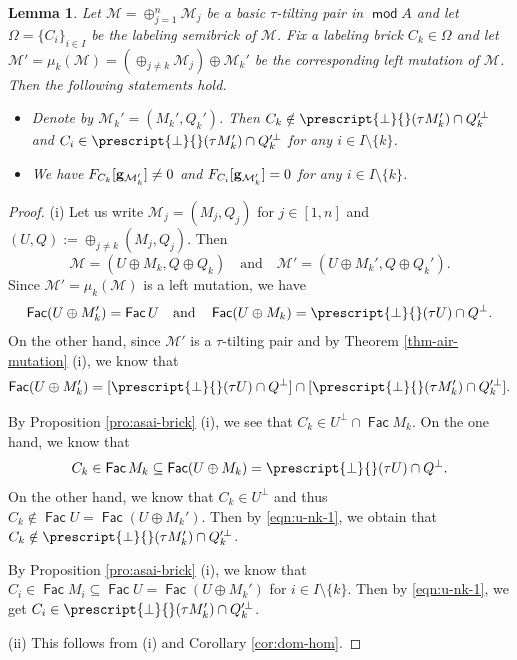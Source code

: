 \documentclass[10pt]{amsart}
\newtheorem{lemma}[theorem]{Lemma}
\theoremstyle{definition}
\theoremstyle{remark}
\numberwithin{equation}{section}
\def\mod{\opname{mod}\nolimits}
\newcommand{\opname}[1]{\operatorname{\mathsf{#1}}}
\newcommand{\Fac}{\opname{Fac}}
\begin{document}
\begin{lemma}\label{lem:multi-brick}
Let $\mathcal M=\oplus_{j=1}^n \mathcal M_j$ be a basic $\tau$-tilting pair in $\mod A$ and let $\Omega=\{C_i\}_{i\in I}$ be the labeling semibrick of $\mathcal M$. Fix a labeling brick $C_k\in\Omega$ and let  $\mathcal M'=\mu_k(\mathcal M)=(\oplus_{j\neq k}\mathcal M_j)\oplus\mathcal M_k'$ be the corresponding left mutation of $\mathcal M$. Then the following statements hold.
\begin{itemize}
    \item [(i)] Denote by $\mathcal M_k'=(M_k',Q_k')$. Then  $C_k\notin \prescript{\bot}{}(\tau M_k')\cap Q_k'^{\bot}$ and $C_i\in \prescript{\bot}{}(\tau M_k')\cap Q_k'^{\bot}$ for any $i\in I\setminus \{k\}$.
    \item[(ii)] We have $F_{C_k}[{\bf g}_{{\mathcal M}_k'}]\neq 0$ and  $F_{C_i}[{\bf g}_{{\mathcal M}_k'}]=0$ for any $i\in I\setminus\{k\}$.
\end{itemize}
\end{lemma}
\begin{proof}
 (i) Let us write 
$\mathcal M_j=(M_j,Q_j)$ for $j\in[1,n]$ and $(U,Q):=\oplus_{j\neq k}(M_j,Q_j)$.
  Then \[\mathcal M=(U\oplus M_k,Q\oplus Q_k)\quad \text{and}\quad \mathcal M'=(U\oplus M_k',Q\oplus Q_k').\]
 Since $\mathcal M'=\mu_k(\mathcal M)$ is a left mutation, we have
\begin{eqnarray*}
   \Fac (U\oplus M_k')=\Fac U\quad\text{and}\quad  \Fac (U\oplus M_k)=\prescript{\bot}{}(\tau U)\cap Q^{\bot}. 
\end{eqnarray*}
 On the other hand, since  $\mathcal M'$ is a $\tau$-tilting pair and by Theorem \ref{thm-air-mutation} (i), we know that 
\begin{eqnarray}\label{eqn:u-nk-1}
    \Fac (U\oplus M_k')=[\prescript{\bot}{}(\tau U)\cap Q^{\bot}]\cap [\prescript{\bot}{}(\tau M_k')\cap Q_k'^{\bot}].
\end{eqnarray}


By Proposition \ref{pro:asai-brick} (i), we see that $C_k\in U^{\bot}\cap \Fac M_k$. On the one hand, we know that 
 \[C_k\in\Fac M_k\subseteq \Fac(U\oplus M_k)=\prescript{\bot}{}(\tau U)\cap Q^{\bot}.\] On the other hand, we know that $C_k\in U^\bot$ and thus $C_k\notin \Fac U=\Fac(U\oplus M_k')$. Then by \eqref{eqn:u-nk-1}, we obtain that $C_k\notin \prescript{\bot}{}(\tau M_k')\cap Q_k'^{\bot}$.

 By Proposition \ref{pro:asai-brick} (i), we know that $C_i\in \Fac M_i\subseteq \Fac U=\Fac (U\oplus M_k')$ for $i\in I\setminus \{k\}$.
 Then by \eqref{eqn:u-nk-1}, we get $C_i\in \prescript{\bot}{}(\tau M_k')\cap Q_k'^{\bot}$.
 
 (ii) This follows from (i) and  Corollary \ref{cor:dom-hom}.
\end{proof}
\end{document}
